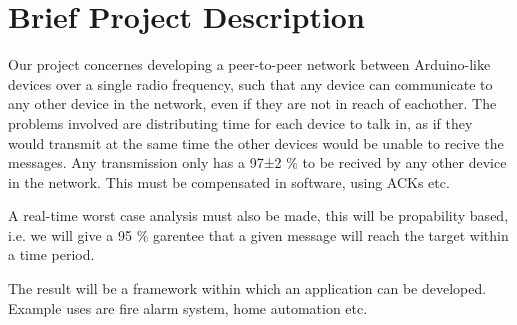\chapter{Brief Project Description}
Our project concernes developing a peer-to-peer network between Arduino-like devices over a single radio frequency, such that any device can communicate to any other device in the network, even if they are not in reach of eachother.
The problems involved are distributing time for each device to talk in, as if they would transmit at the same time the other devices would be unable to recive the messages.
Any transmission only has a 97±2 \% to be recived by any other device in the network.
This must be compensated in software, using ACKs etc.
 
A real-time worst case analysis must also be made, this will be propability based, i.e. we will give a 95 \% garentee that a given message will reach the target within a time period.
 
The result will be a framework within which an application can be developed.
Example uses are fire alarm system, home automation etc.
 
